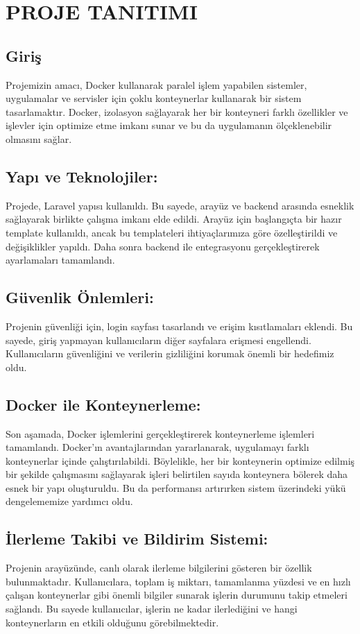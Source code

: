 \section{PROJE TANITIMI }
\subsection{Giriş}
Projemizin amacı, Docker kullanarak paralel işlem yapabilen sistemler, uygulamalar ve servisler için çoklu konteynerlar kullanarak bir sistem tasarlamaktır. Docker, izolasyon sağlayarak her bir konteyneri farklı özellikler ve işlevler için optimize etme imkanı sunar ve bu da uygulamanın ölçeklenebilir olmasını sağlar.
\subsection{Yapı ve Teknolojiler:}
Projede, Laravel yapısı kullanıldı. Bu sayede, arayüz ve backend arasında esneklik sağlayarak birlikte çalışma imkanı elde edildi. Arayüz için başlangıçta bir hazır template kullanıldı, ancak bu templateleri ihtiyaçlarımıza göre özelleştirildi ve değişiklikler yapıldı. Daha sonra backend ile entegrasyonu gerçekleştirerek ayarlamaları tamamlandı.
\subsection{Güvenlik Önlemleri:}
Projenin güvenliği için, login sayfası tasarlandı ve erişim kısıtlamaları eklendi. Bu sayede, giriş yapmayan kullanıcıların diğer sayfalara erişmesi engellendi. Kullanıcıların güvenliğini ve verilerin gizliliğini korumak önemli bir hedefimiz oldu.
\subsection{Docker ile Konteynerleme:}
Son aşamada, Docker işlemlerini gerçekleştirerek konteynerleme işlemleri tamamlandı. Docker'ın avantajlarından yararlanarak, uygulamayı farklı konteynerlar içinde çalıştırılabildi. Böylelikle, her bir konteynerin optimize edilmiş bir şekilde çalışmasını sağlayarak işleri belirtilen sayıda konteynera bölerek daha esnek bir yapı oluşturuldu. Bu da performansı artırırken sistem üzerindeki yükü dengelememize yardımcı oldu.
\subsection{İlerleme Takibi ve Bildirim Sistemi:}
Projenin arayüzünde, canlı olarak ilerleme bilgilerini gösteren bir özellik bulunmaktadır. Kullanıcılara, toplam iş miktarı, tamamlanma yüzdesi ve en hızlı çalışan konteynerlar gibi önemli bilgiler sunarak işlerin durumunu takip etmeleri sağlandı. Bu sayede kullanıcılar, işlerin ne kadar ilerlediğini ve hangi konteynerların en etkili olduğunu görebilmektedir.
